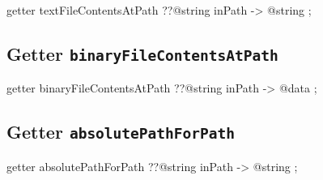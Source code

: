 \begin{galgascode}
getter textFileContentsAtPath ??@string inPath -> @string ;
\end{galgascode}










\subsection{Getter \texttt{binaryFileContentsAtPath}}

\begin{galgascode}
getter binaryFileContentsAtPath ??@string inPath -> @data ;
\end{galgascode}










\subsection{Getter \texttt{absolutePathForPath}}

\begin{galgascode}
getter absolutePathForPath ??@string inPath -> @string ;
\end{galgascode}


